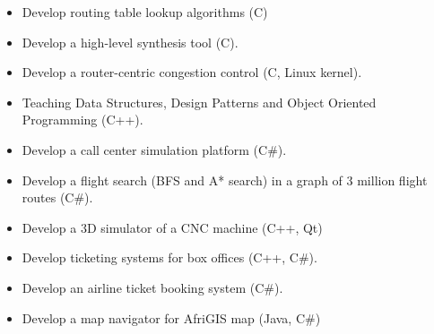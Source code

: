 \begin{itemize}
	\item Develop routing table lookup algorithms (C)
	\item Develop a high-level synthesis tool (C).
	\item Develop a router-centric congestion control (C, Linux kernel).
	\item Teaching Data Structures, Design Patterns and Object Oriented Programming (C++).
\end{itemize}

\divider

\begin{itemize}
	\item Develop a call center simulation platform (C\#).
\end{itemize}

\divider

\begin{itemize}
	\item Develop a flight search (BFS and A* search) in a graph of 3 million flight routes (C\#).
\end{itemize}

\divider

\begin{itemize}
	\item Develop a 3D simulator of a CNC machine (C++, Qt)
\end{itemize}

\divider

\begin{itemize}
	\item Develop ticketing systems for box offices (C++, C\#).
\end{itemize}

\divider

\begin{itemize}
	\item Develop an airline ticket booking system (C\#).
\end{itemize}


\divider

\begin{itemize}
	\item Develop a map navigator for AfriGIS map (Java, C\#)
\end{itemize}

\cvproject{}